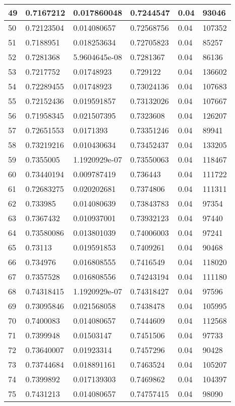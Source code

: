 \begin{longtable}{|l|l|l|l|l|l|}
49 & 0.7167212 & 0.017860048 & 0.7244547 & 0.04 & 93046 \\ \hline 
50 & 0.72123504 & 0.014080657 & 0.72568756 & 0.04 & 107352 \\ \hline 
51 & 0.7188951 & 0.018253634 & 0.72705823 & 0.04 & 85257 \\ \hline 
52 & 0.7281368 & 5.9604645e-08 & 0.7281367 & 0.04 & 86136 \\ \hline 
53 & 0.7217752 & 0.01748923 & 0.729122 & 0.04 & 136602 \\ \hline 
54 & 0.72289455 & 0.01748923 & 0.73024136 & 0.04 & 107683 \\ \hline 
55 & 0.72152436 & 0.019591857 & 0.73132026 & 0.04 & 107667 \\ \hline 
56 & 0.71958345 & 0.021507395 & 0.7323608 & 0.04 & 126207 \\ \hline 
57 & 0.72651553 & 0.0171393 & 0.73351246 & 0.04 & 89941 \\ \hline 
58 & 0.73219216 & 0.010430634 & 0.73452437 & 0.04 & 133205 \\ \hline 
59 & 0.7355005 & 1.1920929e-07 & 0.73550063 & 0.04 & 118467 \\ \hline 
60 & 0.73440194 & 0.009787419 & 0.736443 & 0.04 & 111722 \\ \hline 
61 & 0.72683275 & 0.020202681 & 0.7374806 & 0.04 & 111311 \\ \hline 
62 & 0.733985 & 0.014080639 & 0.73843783 & 0.04 & 97354 \\ \hline 
63 & 0.7367432 & 0.010937001 & 0.73932123 & 0.04 & 97440 \\ \hline 
64 & 0.73580086 & 0.013801039 & 0.74006003 & 0.04 & 97241 \\ \hline 
65 & 0.73113 & 0.019591853 & 0.7409261 & 0.04 & 90468 \\ \hline 
66 & 0.734976 & 0.016808555 & 0.7416549 & 0.04 & 118020 \\ \hline 
67 & 0.7357528 & 0.016808556 & 0.74243194 & 0.04 & 111180 \\ \hline 
68 & 0.74318415 & 1.1920929e-07 & 0.74318427 & 0.04 & 97596 \\ \hline 
69 & 0.73095846 & 0.021568058 & 0.7438478 & 0.04 & 105995 \\ \hline 
70 & 0.7400083 & 0.014080657 & 0.7444609 & 0.04 & 112568 \\ \hline 
71 & 0.7399948 & 0.01503147 & 0.7451506 & 0.04 & 97733 \\ \hline 
72 & 0.73640007 & 0.01923314 & 0.7457296 & 0.04 & 90428 \\ \hline 
73 & 0.73744684 & 0.018891161 & 0.7463524 & 0.04 & 105207 \\ \hline 
74 & 0.7399892 & 0.017139303 & 0.7469862 & 0.04 & 104397 \\ \hline 
75 & 0.7431213 & 0.014080657 & 0.74757415 & 0.04 & 98090 \\ \hline 
\end{longtable}